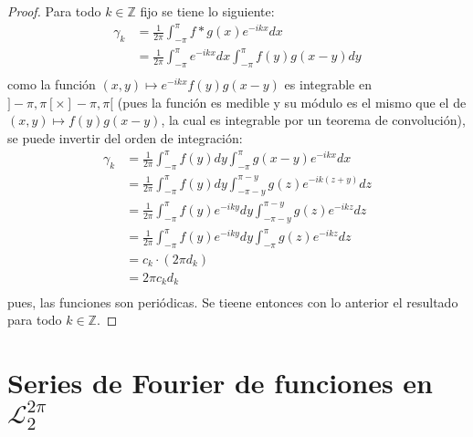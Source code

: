 \documentclass[12pt]{report}
\newcounter{it}
\theoremstyle{largebreak}
\begin{document}
    \begin{proof}
        Para todo $k\in\mathbb{Z}$ fijo se tiene lo siguiente:
        \begin{equation*}
            \begin{split}
                \gamma_k&=\frac{1}{2\pi}\int_{-\pi}^\pi f*g(x)e^{ -ikx}dx\\
                &=\frac{1}{2\pi}\int_{-\pi}^\pi e^{ -ikx}dx\int_{-\pi}^\pi f(y)g(x-y)dy\\
            \end{split}
        \end{equation*}
        como la función $(x,y)\mapsto e^{ -ikx}f(y)g(x-y)$ es integrable en $]-\pi,\pi[\times]-\pi,\pi[$ (pues la función es medible y su módulo es el mismo que el de $(x,y)\mapsto f(y)g(x-y)$, la cual es integrable por un teorema de convolución), se puede invertir del orden de integración:
        \begin{equation*}
            \begin{split}
                \gamma_k&=\frac{1}{2\pi}\int_{-\pi}^\pi f(y)dy\int_{-\pi}^\pi g(x-y)e^{ -ikx}dx\\
                &=\frac{1}{2\pi}\int_{-\pi}^\pi f(y)dy\int_{-\pi-y}^{\pi-y} g(z)e^{ -ik(z+y)}dz\\
                &=\frac{1}{2\pi}\int_{-\pi}^\pi f(y)e^{ -iky}dy\int_{-\pi-y}^{\pi-y} g(z)e^{ -ikz}dz\\
                &=\frac{1}{2\pi}\int_{-\pi}^\pi f(y)e^{ -iky}dy\int_{-\pi}^{\pi} g(z)e^{ -ikz}dz\\
                &=c_k\cdot\left(2\pi d_k \right)\\
                &=2\pi c_kd_k\\
            \end{split}
        \end{equation*}
        pues, las funciones son periódicas. Se tieene entonces con lo anterior el resultado para todo $k\in\mathbb{Z}$.
    \end{proof}

    \section{Series de Fourier de funciones en $\mathcal{L}_2^{2\pi}$}
\end{document}
